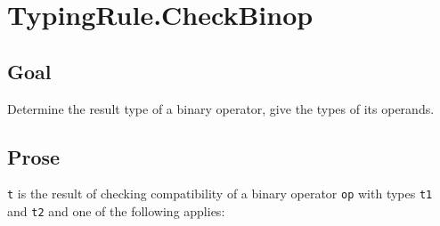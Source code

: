 \documentclass{book}
\begin{document}
\section{TypingRule.CheckBinop \label{sec:TypingRule.CheckBinop}}

\subsection{Goal}
  Determine the result type of a binary operator, give the types of its operands.
  
\subsection{Prose}
  \texttt{t} is the result of checking compatibility of a binary operator \texttt{op} with
  types \texttt{t1} and \texttt{t2} and one of the following applies:
\end{document}
